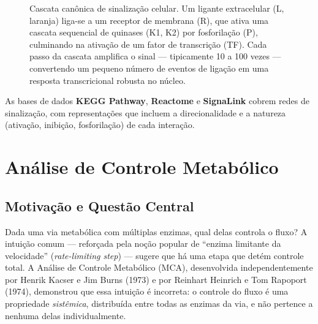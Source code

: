 \begin{figure}[htbp]
\centering
{}
\caption{Cascata canônica de sinalização celular. Um ligante extracelular (L, laranja) liga-se a um receptor de membrana (R), que ativa uma cascata sequencial de quinases (K1, K2) por fosforilação (P), culminando na ativação de um fator de transcrição (TF). Cada passo da cascata amplifica o sinal --- tipicamente 10 a 100 vezes --- convertendo um pequeno número de eventos de ligação em uma resposta transcricional robusta no núcleo.}
\label{fig:03-sinalizacao}
\end{figure}

As bases de dados \textbf{KEGG Pathway}, \textbf{Reactome} e \textbf{SignaLink} cobrem
redes de sinalização, com representações que incluem a direcionalidade e a natureza
(ativação, inibição, fosforilação) de cada interação.


\section{Análise de Controle Metabólico}

\subsection{Motivação e Questão Central}

Dada uma via metabólica com múltiplas enzimas, qual delas controla o fluxo? A intuição
comum --- reforçada pela noção popular de ``enzima limitante da velocidade'' (\textit{rate-limiting
step}) --- sugere que há uma etapa que detém controle total. A Análise de Controle Metabólico
(MCA), desenvolvida independentemente por Henrik Kacser e Jim Burns (1973) e por Reinhart
Heinrich e Tom Rapoport (1974), demonstrou que essa intuição é incorreta: o controle do
fluxo é uma propriedade \emph{sistêmica}, distribuída entre todas as enzimas da via, e não
pertence a nenhuma delas individualmente.

